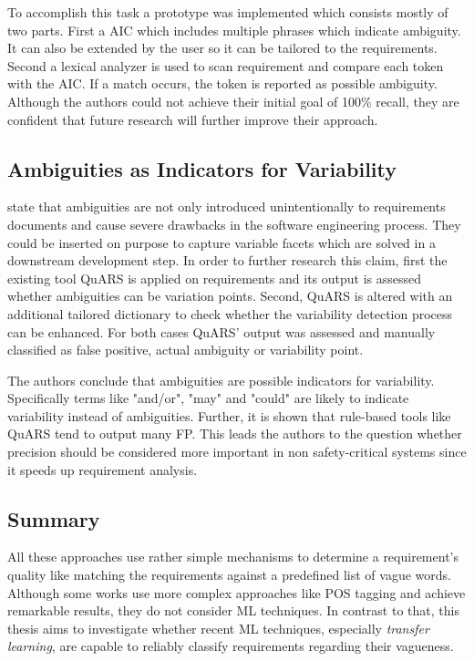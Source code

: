 To accomplish this task a prototype was implemented which consists mostly of two parts.
First a \ac{AIC} which includes multiple phrases which indicate ambiguity.
It can also be extended by the user so it can be tailored to the requirements.
Second a lexical analyzer is used to scan requirement and compare each token with the \ac{AIC}.
If a match occurs, the token is reported as possible ambiguity.
Although the authors could not achieve their initial goal of 100\% recall, they are confident that future research will further improve their approach.

\subsection{Ambiguities as Indicators for Variability}
\textcite{Fantechi:2018} state that ambiguities are not only introduced unintentionally to requirements documents and cause severe drawbacks in the software engineering process.
They could be inserted on purpose to capture variable facets which are solved in a downstream development step.
In order to further research this claim, first the existing tool \ac{QuARS} \parencite{Fabbrini:2002} is applied on requirements and its output is assessed whether ambiguities can be variation points.
Second, \ac{QuARS} is altered with an additional tailored dictionary to check whether the variability detection process can be enhanced.
For both cases \ac{QuARS}' output was assessed and manually classified as false positive, actual ambiguity or variability point.

The authors conclude that ambiguities are possible indicators for variability.
Specifically terms like "and/or", "may" and "could" are likely to indicate variability instead of ambiguities.
Further, it is shown that rule-based tools like \ac{QuARS} tend to output many \ac{FP}.
This leads the authors to the question whether precision should be considered more important in non safety-critical systems since it speeds up requirement analysis.

\subsection{Summary}
All these approaches use rather simple mechanisms to determine a requirement's quality like matching the requirements against a predefined list of vague words.
Although some works use more complex approaches like \ac{POS} tagging and achieve remarkable results, they do not consider \ac{ML} techniques.
In contrast to that, this thesis aims to investigate whether recent \ac{ML} techniques, especially \textit{transfer learning}, are capable to reliably classify requirements regarding their vagueness.
